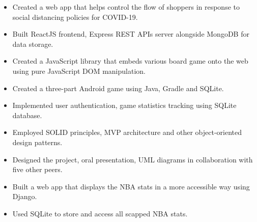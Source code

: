 


\vspace{5pt}

\begin{itemize}
	\item Created a web app that helps control the flow of shoppers in response to social distancing policies for COVID-19.
	\item Built ReactJS frontend, Express REST APIs server alongside MongoDB for data storage.
\end{itemize}

\divider


\vspace{5pt}

\begin{itemize}
	\item Created a JavaScript library that embeds various board game onto the web using pure JavaScript DOM manipulation.
\end{itemize}

\divider


\vspace{5pt}

\begin{itemize}
	\item Created a three-part Android game using Java, Gradle and SQLite.
    \item Implemented user authentication, game statistics tracking using SQLite database.
    \item Employed SOLID principles, MVP architecture and other object-oriented design patterns.
	\item Designed the project, oral presentation, UML diagrams in collaboration with five other peers.
\end{itemize}

\divider


\vspace{5pt}

\begin{itemize}
	\item Built a web app that displays the NBA stats in a more accessible way using Django.
    \item Used SQLite to store and access all scapped NBA stats.
\end{itemize}

